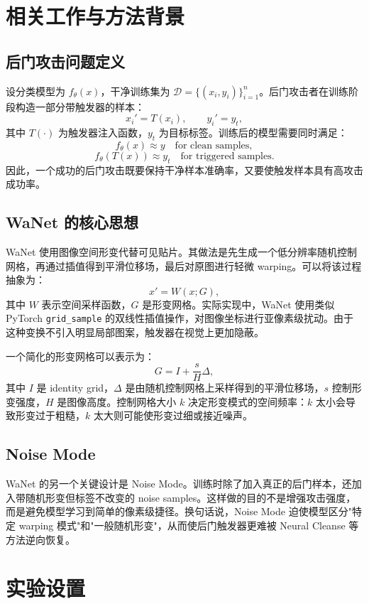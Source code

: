 \documentclass[UTF8,zihao=-4]{ctexart}
\begin{document}
\section{相关工作与方法背景}

\subsection{后门攻击问题定义}

设分类模型为 $f_\theta(x)$，干净训练集为 $\mathcal{D}=\{(x_i,y_i)\}_{i=1}^n$。后门攻击者在训练阶段构造一部分带触发器的样本：
\[
    x_i' = T(x_i), \qquad y_i' = y_t,
\]
其中 $T(\cdot)$ 为触发器注入函数，$y_t$ 为目标标签。训练后的模型需要同时满足：
\[
    f_\theta(x) \approx y \quad \text{for clean samples},
\]
\[
    f_\theta(T(x)) \approx y_t \quad \text{for triggered samples}.
\]
因此，一个成功的后门攻击既要保持干净样本准确率，又要使触发样本具有高攻击成功率。

\subsection{WaNet 的核心思想}

WaNet 使用图像空间形变代替可见贴片。其做法是先生成一个低分辨率随机控制网格，再通过插值得到平滑位移场，最后对原图进行轻微 warping。可以将该过程抽象为：
\[
    x' = W(x; G),
\]
其中 $W$ 表示空间采样函数，$G$ 是形变网格。实际实现中，WaNet 使用类似 PyTorch \texttt{grid\_sample} 的双线性插值操作，对图像坐标进行亚像素级扰动。由于这种变换不引入明显局部图案，触发器在视觉上更加隐蔽。

一个简化的形变网格可以表示为：
\[
    G = I + \frac{s}{H}\Delta,
\]
其中 $I$ 是 identity grid，$\Delta$ 是由随机控制网格上采样得到的平滑位移场，$s$ 控制形变强度，$H$ 是图像高度。控制网格大小 $k$ 决定形变模式的空间频率：$k$ 太小会导致形变过于粗糙，$k$ 太大则可能使形变过细或接近噪声。

\subsection{Noise Mode}

WaNet 的另一个关键设计是 Noise Mode。训练时除了加入真正的后门样本，还加入带随机形变但标签不改变的 noise samples。这样做的目的不是增强攻击强度，而是避免模型学习到简单的像素级捷径。换句话说，Noise Mode 迫使模型区分"特定 warping 模式"和"一般随机形变"，从而使后门触发器更难被 Neural Cleanse 等方法逆向恢复。

\section{实验设置}
\end{document}
